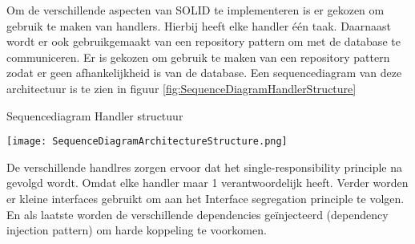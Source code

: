 \whitespace
Om de verschillende aspecten van SOLID te implementeren is er gekozen om gebruik te maken van handlers.
Hierbij heeft elke handler één taak.
Daarnaast wordt er ook gebruikgemaakt van een repository pattern om met de database te communiceren.
Er is gekozen om gebruik te maken van een repository pattern zodat er geen afhankelijkheid is van de database.
Een sequencediagram van deze architectuur is te zien in figuur \ref{fig:SequenceDiagramHandlerStructure}

\begin{graphic}
    \captionsetup{type=figure}
    \caption{Sequencediagram Handler structuur}
    \texttt{[image: SequenceDiagramArchitectureStructure.png]}
    \label{fig:SequenceDiagramHandlerStructure}
\end{graphic}

\whitespace
De verschillende handlres zorgen ervoor dat het single-responsibility principle na gevolgd wordt.
Omdat elke handler maar 1 verantwoordelijk heeft.
Verder worden er kleine interfaces gebruikt om aan het Interface segregation principle te volgen.
En als laatste worden de verschillende dependencies geïnjecteerd (dependency injection pattern) om harde koppeling te voorkomen.
